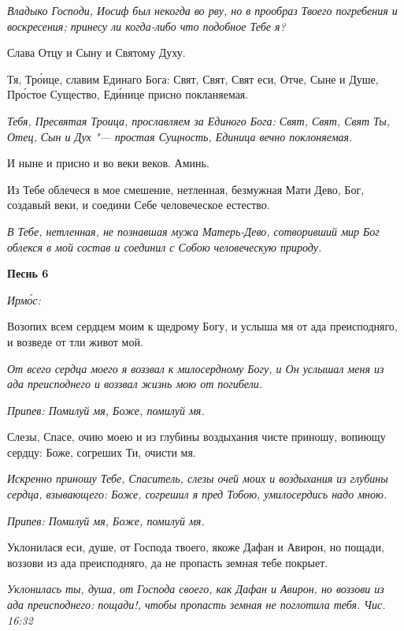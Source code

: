 \itshape Владыко Господи, Иосиф был некогда во рву, но в прообраз Твоего погребения и воскресения; принесу ли когда-либо что подобное Тебе я?\normalfont{}


Слава Отцу и Сыну и Святому Духу.


Тя, Тро́ице, славим Единаго Бога: Свят, Свят, Свят еси, Отче, Сыне и Душе, Про́стое Существо, Еди́нице присно покланяемая.


\itshape Тебя, Пресвятая Троица, прославляем за Единого Бога: Свят, Свят, Свят Ты, Отец, Сын и Дух "--- простая Сущность, Единица вечно поклоняемая.\normalfont{}


И ныне и присно и во веки веков. Аминь.


Из Тебе облечеся в мое смешение, нетленная, безмужная Мати Дево, Бог, создавый веки, и соедини Себе человеческое естество.


\itshape В Тебе, нетленная, не познавшая мужа Матерь-Дево, сотворивший мир Бог облекся в мой состав и соединил с Собою человеческую природу.\normalfont{}





\bfseries Песнь 6\normalfont{}


\itshape Ирмо́с:\normalfont{}


Возопих всем сердцем моим к щедрому Богу, и услыша мя от ада преисподняго, и возведе от тли живот мой.


\itshape От всего сердца моего я воззвал к милосердному Богу, и Он услышал меня из ада преисподнего и воззвал жизнь мою от погибели.\normalfont{}


\itshape Припев:\normalfont{} Помилуй мя, Боже, помилуй мя.


Слезы, Спасе, очию моею и из глубины воздыхания чисте приношу, вопиющу сердцу: Боже, согреших Ти, очисти мя.


\itshape Искренно приношу Тебе, Спаситель, слезы очей моих и воздыхания из глубины сердца, взывающего: Боже, согрешил я пред Тобою, умилосердись надо мною.\normalfont{}


\itshape Припев:\normalfont{} Помилуй мя, Боже, помилуй мя.


Уклонилася еси, душе, от Господа твоего, якоже Дафан и Авирон, но пощади, воззови из ада преисподняго, да не пропасть земная тебе покрыет.


\itshape Уклонилась ты, душа, от Господа своего, как Дафан и Авирон, но воззови из ада преисподнего: пощади!, чтобы пропасть земная не поглотила тебя. Чис. 16:32\normalfont{}


